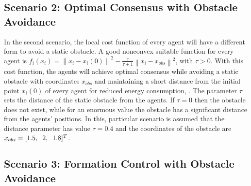 \subsection{Scenario 2: Optimal Consensus with Obstacle Avoidance}

    In the second scenario, the local cost function of every agent will have a different form to avoid a static obstacle. A good nonconvex suitable function for every agent is $f_i(x_i) =  \left \lVert x_i - x_i(0) \right \rVert^2 - \frac{\tau}{\tau + 1}  \left \lVert x_i - x_{obs} \right \rVert^2 $, with $\tau > 0$. With this cost function, the agents will achieve optimal consensus while avoiding a static obstacle with coordinates $x_{obs}$ and maintaining a short distance from the initial point $x_i(0)$ of every agent for reduced energy consumption, \cite{10125000}. The parameter $\tau$ sets the distance of the static obstacle from the agents. If $\tau = 0$ then the obstacle does not exist, while for an enormous value the obstacle has a significant distance from the agents' positions. In this, particular scenario is assumed that the distance parameter has value $\tau = 0.4$ and the coordinates of the obstacle are $x_{obs} = [1.5, \hspace{2.0mm} 2, \hspace{2.0mm} 1.8]^T$. 


















    
\subsection{Scenario 3: Formation Control with Obstacle Avoidance}

